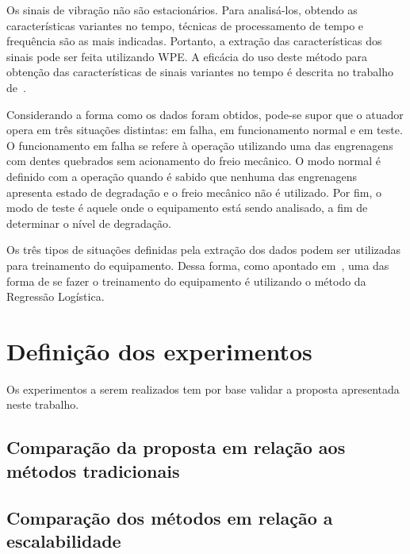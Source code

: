 Os sinais de vibração não são estacionários. Para analisá-los, obtendo as características variantes
no tempo, técnicas de processamento de tempo e frequência são as mais indicadas. Portanto, a
extração das características dos sinais pode ser feita utilizando \gls{WPE}. A eficácia do uso deste
método para obtenção das características de sinais variantes no tempo é descrita no trabalho
de~\cite{qiu2006wavelet}.

Considerando a forma como os dados foram obtidos, pode-se supor que o atuador opera em três
situações distintas: em falha, em funcionamento normal e em teste. O funcionamento em falha se
refere à operação utilizando uma das engrenagens com dentes quebrados sem acionamento do freio
mecânico. O modo normal é definido com a operação quando é sabido que nenhuma das engrenagens
apresenta estado de degradação e o freio mecânico não é utilizado. Por fim, o modo de teste é aquele
onde o equipamento está sendo analisado, a fim de determinar o nível de degradação.

Os três tipos de situações definidas pela extração dos dados podem ser utilizadas para treinamento
do equipamento. Dessa forma, como apontado em~\cite{lazzaretti2012avaliacao}, uma das forma de se
fazer o treinamento do equipamento é utilizando o método da Regressão Logística.

\section{Definição dos experimentos}

Os experimentos a serem realizados tem por base validar a proposta apresentada neste trabalho.


\subsection{Comparação da proposta em relação aos métodos tradicionais}


\subsection{Comparação dos métodos em relação a escalabilidade}

